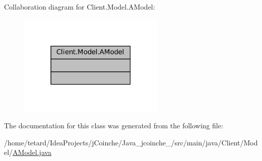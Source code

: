Collaboration diagram for Client.\+Model.\+A\+Model\+:
\nopagebreak
\begin{figure}[H]
\begin{center}
\leavevmode
\includegraphics[width=198pt]{classClient_1_1Model_1_1AModel__coll__graph}
\end{center}
\end{figure}


The documentation for this class was generated from the following file\+:\begin{DoxyCompactItemize}
\item 
/home/tetard/\+Idea\+Projects/j\+Coinche/\+Java\+\_\+jcoinche\+\_/src/main/java/\+Client/\+Model/\mbox{\hyperlink{AModel_8java}{A\+Model.\+java}}\end{DoxyCompactItemize}
